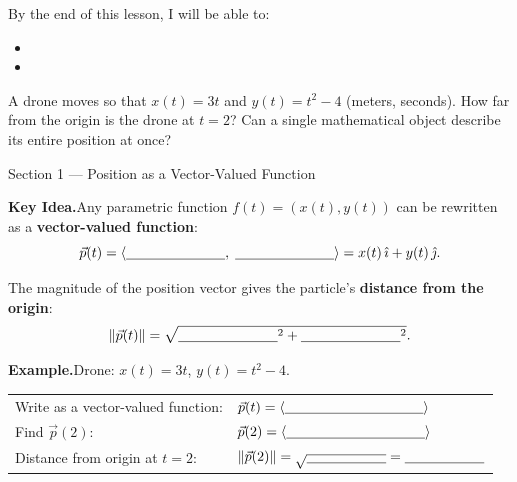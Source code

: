 \documentclass[10pt]{article}
\begin{document}
\namedateperiod

\vspace{0.1in}

\begin{objectivebox}
By the end of this lesson, I will be able to:
\begin{itemize}[leftmargin=1.5em, itemsep=3pt]
  \item \writeline
  \item \writeline
\end{itemize}
\end{objectivebox}

\vspace{0.08in}

\begin{vocabbox}
\end{vocabbox}

\vspace{0.08in}

\begin{hookbox}
A drone moves so that $x(t)=3t$ and $y(t)=t^{2}-4$ (meters, seconds).
How far from the origin is the drone at $t=2$?  Can a single
mathematical object describe its entire position at once?

\writeline
\end{hookbox}

\vspace{0.08in}

\begin{notesbox}{Section 1 --- Position as a Vector-Valued Function}
\small

\textbf{Key Idea.}\quad Any parametric function $f(t)=(x(t),y(t))$ can be
rewritten as a \textbf{vector-valued function}:
\[
  \vec{p}(t) = \langle \blank{2.5cm},\;\blank{2.5cm}\rangle
             = x(t)\,\hat{\imath} + y(t)\,\hat{\jmath}.
\]

The magnitude of the position vector gives the particle's \textbf{distance from the origin}:
\[
  \|\vec{p}(t)\| = \sqrt{\blank{2.5cm}^{2} + \blank{2.5cm}^{2}}.
\]

\vspace{0.1in}
\textbf{Example.}\quad Drone: $x(t)=3t$, $y(t)=t^{2}-4$.

\begin{tabularx}{\linewidth}{@{}Xl@{}}
Write as a vector-valued function: & $\vec{p}(t) = \langle \blank{3.5cm}\rangle$ \\[12pt]
Find $\vec{p}(2)$: & $\vec{p}(2) = \langle \blank{3.5cm}\rangle$ \\[12pt]
Distance from origin at $t=2$: & $\|\vec{p}(2)\| = \sqrt{\blank{2cm}} = \blank{2cm}$
\end{tabularx}
\end{notesbox}
\end{document}
